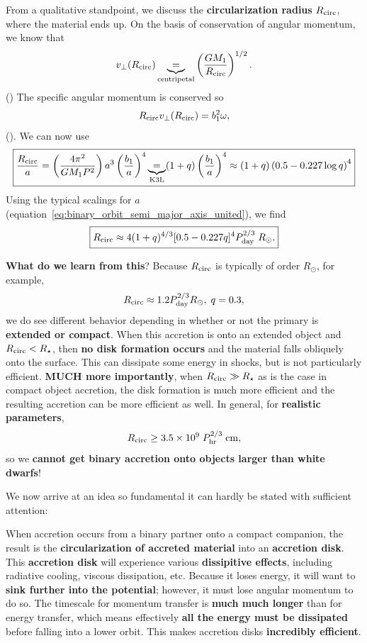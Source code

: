 \vspace{0.5cm}
From a qualitative standpoint, we discuss the \textbf{circularization radius} $R_{\rm circ}$, where the material ends up. On the basis of conservation of angular momentum, we know that
\[
v_{\perp}(R_{\rm circ}) \underbrace{=}_{\rm centripetal} \left(\frac{GM_1}{R_{\rm circ}}\right)^{1/2}.
\]
()
The specific angular momentum is conserved so
\[
R_{\rm circ} v_\perp(R_{\rm circ}) = b_1^2 \omega,
\]
(). We can now use 
\begin{equation}
\label{eq:cicularization_radius}
    \boxed{
    \frac{R_{\rm circ}}{a} = \left(\frac{4 \pi^2}{GM_{1} P^2}\right)a^3 \left(\frac{b_1}{a}\right)^4 \underbrace{=}_{\text{K3L}} (1+q)\left(\frac{b_1}{a}\right)^{4} \approx \left(1+q\right) \left(0.5 - 0.227\log q\right)^4
    }
\end{equation}
Using the typical scalings for $a$ (equation~\eqref{eq:binary_orbit_semi_major_axis_united}), we find
\[
\boxed{
R_{\rm circ} \approx 4(1+q)^{4/3} [0.5 - 0.227 q]^4 P^{2/3}_{\rm day} \;R_\odot.
}
\]
\par
\textbf{What do we learn from this}? Because $R_{\rm circ}$ is typically of order $R_\odot$, for example,
\[
R_{\rm circ} \approx 1.2 P_{\rm day}^{2/3} R_\odot,\;q=0.3,
\]
we do see different behavior depending in whether or not the primary is \textbf{extended or compact}. When this accretion is onto an extended object and $R_{\rm circ} < R_{\star}$, then \textbf{no disk formation occurs} and the material falls obliquely onto the surface. This can dissipate some energy in shocks, but is not particularly efficient. \textbf{MUCH more importantly}, when $R_{\rm circ} \gg R_\star$ as is the case in compact object accretion, the disk formation is much more efficient and the resulting accretion can be more efficient as well. In general, for \textbf{realistic parameters},
\[
R_{\rm circ} \ge 3.5 \times 10^{9}\; P^{2/3}_{\rm hr}\;{\rm cm},
\]
so we \textbf{cannot get binary accretion onto objects larger than white dwarfs}!
\par
We now arrive at an idea so fundamental it can hardly be stated with sufficient attention:
\begin{bigidea}
    When accretion occurs from a binary partner onto a compact companion, the result is the \textbf{circularization of accreted material} into an \textbf{accretion disk}. This \textbf{accretion disk} will experience various \textbf{dissipitive effects}, including radiative cooling, viscous dissipation, etc. Because it loses energy, it will want to \textbf{sink further into the potential}; however, it must lose angular momentum to do so. The timescale for momentum transfer is \textbf{much much longer} than for energy transfer, which means
    \newline
    effectively \textbf{all the energy must be dissipated} before falling into a lower orbit. This makes accretion disks \textbf{incredibly efficient}.
\end{bigidea}
